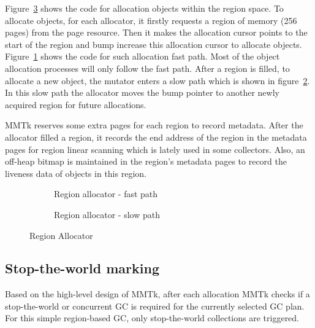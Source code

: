 Figure~\ref{fig:allocator} shows the code for allocation objects within the region space.
To allocate objects, for each allocator, it firstly requests a region of memory (256 pages) from the page resource.
Then it makes the allocation cursor points to the start of the region and bump increase this
allocation cursor to allocate objects. Figure~\ref{fig:allocator:fast} shows the code for such
allocation fast path. Most of the object allocation processes will only follow the
fast path. 
After a region is filled, to allocate a new object, the mutator enters a slow path
which is shown in figure~\ref{fig:allocator:slow}.
In this slow path the allocator moves the bump pointer to another newly acquired region for future allocations.

MMTk reserves some extra pages for each region to record metadata.
After the allocator filled a region, it records the end address of the region in the metadata pages for 
region linear scanning which is lately used in some collectors. Also, an off-heap bitmap is
maintained in the region's metadata pages to record the liveness data of objects in this region.

\begin{figure}
  \centering
  \begin{subfigure}[a]{\textwidth}
    
    \caption{Region allocator - fast path}
    \label{fig:allocator:fast}
  \end{subfigure}

  \begin{subfigure}[b]{\textwidth}
    
    \caption{Region allocator - slow path}
    \label{fig:allocator:slow}
  \end{subfigure}

  \caption{Region Allocator}
  \label{fig:allocator}
\end{figure}

\subsection{Stop-the-world marking}

Based on the high-level design of MMTk, after each allocation MMTk checks if a stop-the-world
or concurrent GC is required for the currently selected GC plan.
For this simple region-based GC, only stop-the-world collections are triggered.

